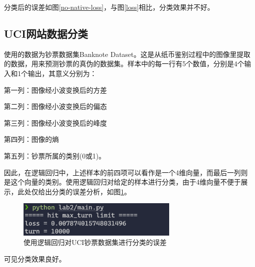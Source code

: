 分类后的误差如图\ref{no-native-loss}，与图\ref{loss}相比，分类效果并不好。

\subsection{UCI网站数据分类}

使用的数据为钞票数据集Banknote Dataset\cite{uci}。这是从纸币鉴别过程中的图像里提取的数据，用来预测钞票的真伪的数据集。样本中的每一行有5个数值，分别是4个输入和1个输出，其意义分别为：

第一列：图像经小波变换后的方差

第二列：图像经小波变换后的偏态

第三列：图像经小波变换后的峰度

第四列：图像的熵

第五列：钞票所属的类别(0或1)。

因此，在逻辑回归中，上述样本的前四项可以看作是一个4维向量，而最后一列则是这个向量的类别。使用逻辑回归对给定的样本进行分类，由于4维向量不便于展示，此处仅给出分类的误差分析，如图\ref{uci}。

\begin{figure}[htbp]
    \centering
    \includegraphics[width=0.7\textwidth]{figures/Figure_8.png}
    \caption{使用逻辑回归对UCI钞票数据集进行分类的误差}
    \label{uci}
\end{figure}

可见分类效果良好。
